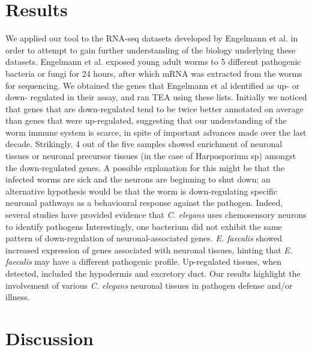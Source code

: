 \documentclass[linenumbers, doublespacing]{bmcart}
\begin{document}
	
\section*{Results}
	We applied our tool to the RNA-seq datasets developed by Engelmann et al. \cite{Engelmann2010} in order to attempt to gain further understanding of the biology underlying these datasets. Engelmann et al.  exposed young adult worms to 5 different pathogenic bacteria or fungi for 24 hours, after which mRNA was extracted from the worms for sequencing. We obtained the genes that Engelmann et al identified as up- or down- regulated in their assay, and ran TEA using these lists. Initially we noticed that genes that are down-regulated tend to be twice better annotated on average than genes that were up-regulated, suggesting that our understanding of the worm immune system is scarce, in spite of important advances made over the last decade. Strikingly, 4 out of the five samples showed enrichment of neuronal tissues or neuronal precursor tissues (in the case of Harposporium sp) amongst the down-regulated genes. A possible explanation for this might be that the infected worms are sick and the neurons are beginning to shut down; an alternative hypothesis would be that the worm is down-regulating specific neuronal pathways as a behavioural response against the pathogen. Indeed, several studies\cite{Meisel2014, Zhang2005} have provided evidence that \emph{C. elegans} uses chemosensory neurons to identify pathogens Interestingly, one bacterium did not exhibit the same pattern of down-regulation of neuronal-associated genes. \emph{E. faecalis} showed increased expression of genes associated with neuronal tissues, hinting that \emph{E. faecalis} may have a different pathogenic profile. Up-regulated tissues, when detected, included the hypodermis and excretory duct. 
	Our results highlight the involvement of various \emph{C. elegans} neuronal tissues in pathogen defense and/or illness.
	
\section*{Discussion}
\end{document}
